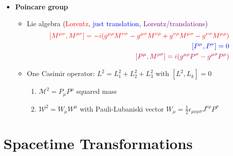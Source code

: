 \documentclass[10pt,a4paper]{report}
\theoremstyle{definition}
\begin{document}
\begin{itemize}
\begin{itemize}
\end{itemize}

\item {\bf Poincare group}
\begin{itemize}
\item Lie algebra (\textcolor{red}{Lorentz}, \textcolor{blue}{just translation}, \textcolor{purple}{Lorentz/translations})
\begin{align}
\textcolor{red}{[M^{\mu\nu},M^{\rho\sigma}]=-i(g^{\mu\rho}M^{\nu\sigma}-g^{\mu\sigma}M^{\nu\rho}+g^{\nu\rho}M^{\mu\sigma}-g^{\nu\sigma}M^{\mu\rho})}\\
\textcolor{blue}{[P^\mu,P^\nu]=0}\\
\textcolor{purple}{[P^\mu,M^{\rho\sigma}]=i(g^{\mu\rho}P^\sigma-g^{\mu\sigma}P^\rho)}
\end{align}
\item One Casimir operator: $L^2=L_1^2+L_2^2+L_3^2$ with $[L^2,L_k]=0$
\begin{enumerate}
\item $\mathcal{M}^2=P_\mu P^\mu$ squared mass
\item $\mathcal{W}^2=W_\mu W^\mu$ with Pauli-Lubaniski vector $W_\mu=\frac{1}{2}\epsilon_{\mu\nu\rho\sigma} J^{\nu\rho}P^\sigma$
\end{enumerate}
\end{itemize}

\end{itemize}


\section{Spacetime Transformations}
\end{document}
